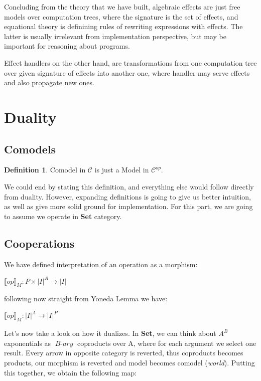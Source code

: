 \documentclass[declaration,shortabstract]{iithesis}
\theoremstyle{definition} \newtheorem{definition}{Definition}[chapter]
\theoremstyle{remark} \newtheorem{remark}[definition]{Observation}
\theoremstyle{plain} \newtheorem{theorem}[definition]{Theorem}
\theoremstyle{plain} \newtheorem{lemma}[definition]{Lemma}
\newcommand{\mathVar}[1]{{\operatorname{\mathit{#1}}}}
\begin{document}
Concluding from the theory that we have built, algebraic effects are just free
models over computation trees, where the signature is the set of effects, and
equational theory is definining rules of rewriting expressions with effects.
The latter is usually irrelevant from implementation perspective, but may be
important for reasoning about programs.

Effect handlers on the other hand, are transformations from one computation
tree over given signature of effects into another one, where handler may serve
effects and also propagate new ones.

\section{Duality}
    \subsection{Comodels}

    \begin{definition}
        Comodel in $\mathcal{C}$ is just a Model in $ \mathcal{C}^{op} $.
    \end{definition}

    We could end by stating this definition, and everything else would follow
    directly from duality. However, expanding definitions is going to give us
    better intuition, as well as give more solid ground for implementation.
    For this part, we are going to assume we operate in \textbf{Set} category.

    \subsection{Cooperations}

    We have defined interpretation of an operation as a morphism:

    \begin{center}
        $ {\llbracket op \rrbracket}_M : P \times {|I|}^{A} \rightarrow |I| $
    \end{center}

    \noindent
    following now straight from Yoneda Lemma we have:

    \begin{center}
        $ {\llbracket op \rrbracket}_M : {|I|}^{A} \rightarrow |I|^{P} $
    \end{center}

    \noindent
    Let's now take a look on how it dualizes. In \textbf{Set}, we can think about
    $A^{B}$ exponentials as $\mathVar{B-ary}$ coproducts over A, where for each
    argument we select one result. Every arrow in opposite category is reverted,
    thus coproducts becomes products, our morphism is reverted and model becomes
    comodel (\textit{world}). Putting this together, we obtain the following map:
\end{document}
